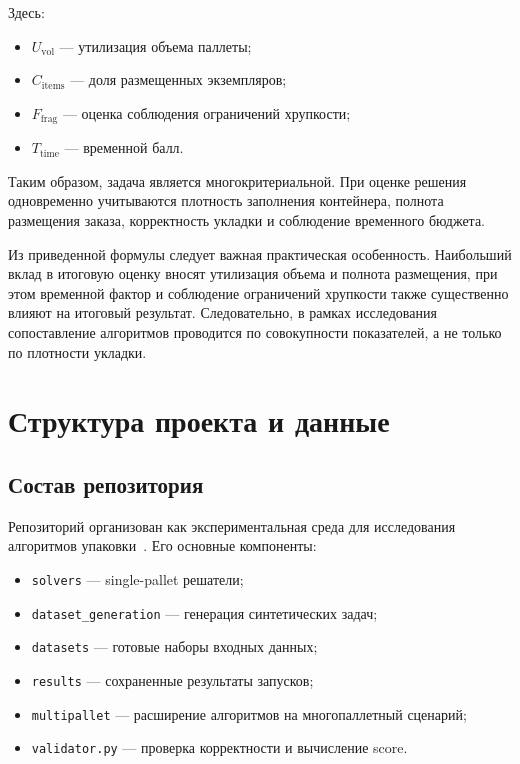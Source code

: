 \documentclass[14pt,a4paper]{extarticle}
\begin{document}
Здесь:
\begin{itemize}
  \item $U_{\text{vol}}$ --- утилизация объема паллеты;
  \item $C_{\text{items}}$ --- доля размещенных экземпляров;
  \item $F_{\text{frag}}$ --- оценка соблюдения ограничений хрупкости;
  \item $T_{\text{time}}$ --- временной балл.
\end{itemize}

Таким образом, задача является многокритериальной. При оценке решения одновременно учитываются плотность заполнения контейнера, полнота размещения заказа, корректность укладки и соблюдение временного бюджета.

Из приведенной формулы следует важная практическая особенность. Наибольший вклад в итоговую оценку вносят утилизация объема и полнота размещения, при этом временной фактор и соблюдение ограничений хрупкости также существенно влияют на итоговый результат. Следовательно, в рамках исследования сопоставление алгоритмов проводится по совокупности показателей, а не только по плотности укладки.

\pagebreak

\section{Структура проекта и данные}

\subsection{Состав репозитория}

Репозиторий организован как экспериментальная среда для исследования алгоритмов упаковки~\cite{project_repo}. Его основные компоненты:
\begin{itemize}
  \item \texttt{solvers} --- single-pallet решатели;
  \item \texttt{dataset\_generation} --- генерация синтетических задач;
  \item \texttt{datasets} --- готовые наборы входных данных;
  \item \texttt{results} --- сохраненные результаты запусков;
  \item \texttt{multipallet} --- расширение алгоритмов на многопаллетный сценарий;
  \item \texttt{validator.py} --- проверка корректности и вычисление score.
\end{itemize}
\end{document}
